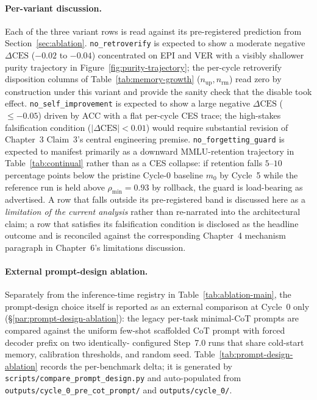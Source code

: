 \paragraph{Per-variant discussion.}
Each of the three variant rows is read against its pre-registered prediction from Section~\ref{sec:ablation}. \texttt{no\_retroverify} is expected to show a moderate negative $\Delta\text{CES}$ ($-0.02$ to $-0.04$) concentrated on EPI and VER with a visibly shallower purity trajectory in Figure~\ref{fig:purity-trajectory}; the per-cycle retroverify disposition columns of Table~\ref{tab:memory-growth} ($n_{\text{up}}, n_{\text{rm}}$) read zero by construction under this variant and provide the sanity check that the disable took effect. \texttt{no\_self\_improvement} is expected to show a large negative $\Delta\text{CES}$ ($\leq -0.05$) driven by ACC with a flat per-cycle CES trace; the high-stakes falsification condition ($|\Delta\text{CES}| < 0.01$) would require substantial revision of Chapter~3 Claim~3's central engineering premise. \texttt{no\_forgetting\_guard} is expected to manifest primarily as a downward MMLU-retention trajectory in Table~\ref{tab:continual} rather than as a CES collapse: if retention falls $5$--$10$ percentage points below the pristine Cycle-0 baseline $m_{0}$ by Cycle~5 while the reference run is held above $\rho_{\min} = 0.93$ by rollback, the guard is load-bearing as advertised. A row that falls outside its pre-registered band is discussed here as a \emph{limitation of the current analysis} rather than re-narrated into the architectural claim; a row that satisfies its falsification condition is disclosed as the headline outcome and is reconciled against the corresponding Chapter~4 mechanism paragraph in Chapter~6's limitations discussion.

\paragraph{External prompt-design ablation.}
Separately from the inference-time registry in
Table~\ref{tab:ablation-main}, the prompt-design choice itself is
reported as an external comparison at Cycle~0 only
(\S\ref{par:prompt-design-ablation}): the legacy per-task
minimal-CoT prompts are compared against the uniform few-shot
scaffolded CoT prompt with forced decoder prefix on two identically-
configured Step~7.0 runs that share cold-start memory, calibration
thresholds, and random seed. Table~\ref{tab:prompt-design-ablation}
records the per-benchmark delta; it is generated by
\texttt{scripts/compare\_prompt\_design.py} and auto-populated from
\texttt{outputs/cycle\_0\_pre\_cot\_prompt/} and
\texttt{outputs/cycle\_0/}.


